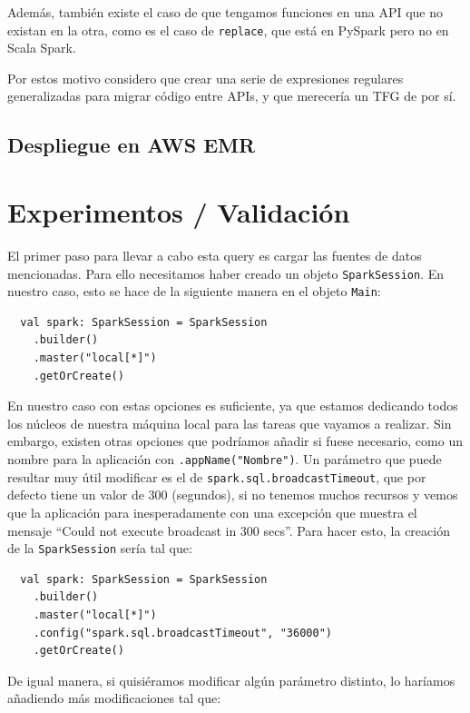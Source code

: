 \documentclass[12pt,twoside,titlepage]{report}
\newcommand{\quotes}[1]{``#1''}
\begin{document}
Además, también existe el caso de que tengamos funciones en una API que no existan en la otra, como es el caso de \texttt{replace}, que está en PySpark pero no en Scala Spark.

Por estos motivo considero que crear una serie de expresiones regulares generalizadas para migrar código entre APIs, y que merecería un TFG de por sí.




\section{Despliegue en AWS EMR}



\chapter{Experimentos / Validación}
\label{sec:expVal}
\newpage

El primer paso para llevar a cabo esta query es cargar las fuentes de datos mencionadas. Para ello necesitamos haber creado un objeto \texttt{SparkSession}. En nuestro caso, esto se hace de la siguiente manera en el objeto \texttt{Main}:

\begin{lstlisting}
  val spark: SparkSession = SparkSession
    .builder()
    .master("local[*]")
    .getOrCreate()
\end{lstlisting}

En nuestro caso con estas opciones es suficiente, ya que estamos dedicando todos los núcleos de nuestra máquina local para las tareas que vayamos a realizar. Sin embargo, existen otras opciones que podríamos añadir si fuese necesario, como un nombre para la aplicación con \texttt{.appName("Nombre")}. Un parámetro que puede resultar muy útil modificar es el de \texttt{spark.sql.broadcastTimeout}, que por defecto tiene un valor de 300 (segundos), si no tenemos muchos recursos y vemos que la aplicación para inesperadamente con una excepción que muestra el mensaje \quotes{Could not execute broadcast in 300 secs}. Para hacer esto, la creación de la \texttt{SparkSession} sería tal que:

\begin{lstlisting}
  val spark: SparkSession = SparkSession
    .builder()
    .master("local[*]")
    .config("spark.sql.broadcastTimeout", "36000")
    .getOrCreate()
\end{lstlisting}

De igual manera, si quisiéramos modificar algún parámetro distinto, lo haríamos añadiendo más modificaciones tal que: 
\end{document}
